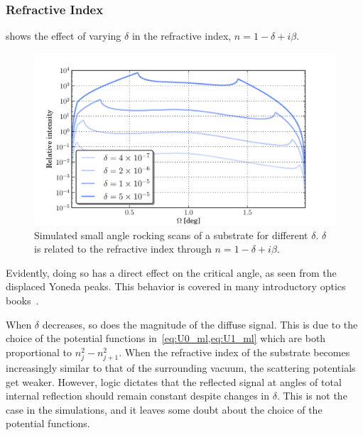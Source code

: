 \documentclass[10pt,twoside, b5paper,pdftex]{report}
\begin{document}
\subsubsection{Refractive Index}
 shows the effect of varying $\delta$ in the refractive index, $n = 1 - \delta + i\beta$.
\begin{figure}[htbp]
	\begin{center}
		\includegraphics[width=1.0\textwidth]{figures/var_delta.pdf}
	\end{center}
	\caption{Simulated small angle rocking scans of a substrate for different $\delta$. $\delta$ is related to the refractive index through $n = 1 - \delta + i\beta$. \label{fig:var_delta}}
\end{figure}
Evidently, doing so has a direct effect on the critical angle, as seen from the displaced Yoneda peaks. This behavior is covered in many introductory optics books~\cite{PEDROTTI}.

When $\delta$ decreases, so does the magnitude of the diffuse signal. This is due to the choice of the potential functions in~\cref{eq:U0_ml,eq:U1_ml} which are both proportional to $n_{j}^2 - n_{j+1}^2$. When the refractive index of the substrate becomes increasingly similar to that of the surrounding vacuum, the scattering potentials get weaker. However, logic dictates that the reflected signal at angles of total internal reflection should remain constant despite changes in $\delta$. This is not the case in the simulations, and it leaves some doubt about the choice of the potential functions.
\end{document}
